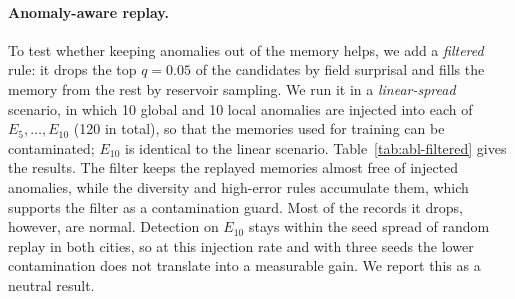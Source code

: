 \documentclass{article} %
\begin{document}
\paragraph{Anomaly-aware replay.}
To test whether keeping anomalies out of the memory helps, we add a
\emph{filtered} rule: it drops the top $q = 0.05$ of the candidates by field
surprisal and fills the memory from the rest by reservoir sampling. We run it in
a \emph{linear-spread} scenario, in which 10 global and 10 local anomalies are
injected into each of $E_5,\dots,E_{10}$ (120 in total), so that the memories
used for training can be contaminated; $E_{10}$ is identical to the linear
scenario. Table~\ref{tab:abl-filtered} gives the results. The filter keeps the
replayed memories almost free of injected anomalies, while the diversity and
high-error rules accumulate them, which supports the filter as a contamination
guard. Most of the records it drops, however, are normal. Detection on $E_{10}$
stays within the seed spread of random replay in both cities, so at this
injection rate and with three seeds the lower contamination does not translate
into a measurable gain. We report this as a neutral result.
\end{document}
